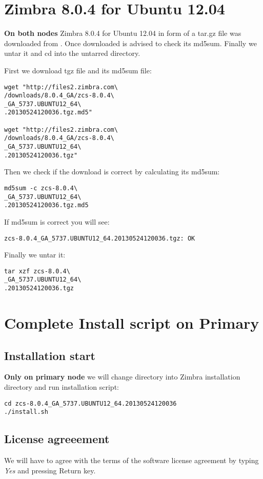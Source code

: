 \section {Zimbra 8.0.4 for Ubuntu 12.04}
\textbf{On both nodes}
Zimbra 8.0.4 for Ubuntu 12.04 in form of a tar.gz file was downloaded from \cite{Zimbra8Download}.
Once downloaded is advised to check its md5sum. Finally we untar it and cd into the untarred directory.

First we download tgz file and its md5sum file:
\begin{verbatim}
wget "http://files2.zimbra.com\
/downloads/8.0.4_GA/zcs-8.0.4\
_GA_5737.UBUNTU12_64\
.20130524120036.tgz.md5"

wget "http://files2.zimbra.com\
/downloads/8.0.4_GA/zcs-8.0.4\
_GA_5737.UBUNTU12_64\
.20130524120036.tgz"
\end{verbatim}
Then we check if the download is correct by calculating its md5sum:
\begin{verbatim}
md5sum -c zcs-8.0.4\
_GA_5737.UBUNTU12_64\
.20130524120036.tgz.md5
\end{verbatim}
If md5sum is correct you will see:
\begin{verbatim}
zcs-8.0.4_GA_5737.UBUNTU12_64.20130524120036.tgz: OK
\end{verbatim}
Finally we untar it:
\begin{verbatim}
tar xzf zcs-8.0.4\
_GA_5737.UBUNTU12_64\
.20130524120036.tgz
\end{verbatim}

\section {Complete Install script on Primary}
\subsection {Installation start}
\textbf{Only on primary node} we will change directory into Zimbra installation directory and run installation script:

\begin{verbatim}
cd zcs-8.0.4_GA_5737.UBUNTU12_64.20130524120036
./install.sh
\end{verbatim}
\subsection {License agreeement}
We will have to agree with the terms of the software license agreement by typing \textit{Yes} and pressing Return key.

